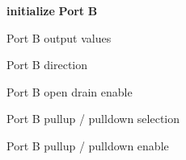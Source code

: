 {\bfseries initialize} {\bfseries Port} {\bfseries B} ~\newline
~\newline
~\newline
~\newline
~\newline
~\newline
~\newline
~\newline
~\newline
~\newline

\begin{DoxyItemize}
\item Port B output values ~\newline
~\newline
~\newline
~\newline
~\newline
~\newline
~\newline
~\newline
~\newline

\item Port B direction ~\newline
~\newline
~\newline
~\newline
~\newline
~\newline
~\newline
~\newline

\item Port B open drain enable ~\newline
~\newline
~\newline
~\newline
~\newline
~\newline
~\newline

\item Port B pullup / pulldown selection ~\newline
~\newline
~\newline
~\newline
~\newline
~\newline

\item Port B pullup / pulldown enable
\end{DoxyItemize}

